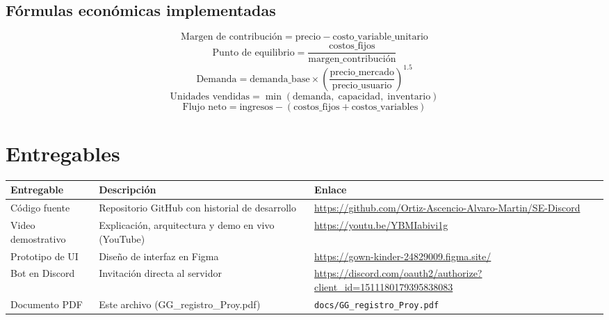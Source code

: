 \documentclass[12pt,spanish]{article}
\begin{document}
\subsection*{Fórmulas económicas implementadas}

\begin{tcolorbox}[colback=codebg, colframe=gray!50, fontupper=\small]
\[
  \text{Margen de contribución} = \text{precio} - \text{costo\_variable\_unitario}
\]
\[
  \text{Punto de equilibrio} = \frac{\text{costos\_fijos}}{\text{margen\_contribución}}
\]
\[
  \text{Demanda} = \text{demanda\_base} \times
    \left(\frac{\text{precio\_mercado}}{\text{precio\_usuario}}\right)^{1.5}
\]
\[
  \text{Unidades vendidas} = \min(\text{demanda},\; \text{capacidad},\; \text{inventario})
\]
\[
  \text{Flujo neto} = \text{ingresos} - (\text{costos\_fijos} + \text{costos\_variables})
\]
\end{tcolorbox}

\section{Entregables}

\begin{center}
\begin{tabular}{lll}
  \toprule
  Entregable & Descripci\'on & Enlace \\
  \midrule
  C\'odigo fuente & Repositorio GitHub con historial de desarrollo
    & \url{https://github.com/Ortiz-Ascencio-Alvaro-Martin/SE-Discord} \\[4pt]
  Video demostrativo & Explicaci\'on, arquitectura y demo en vivo (YouTube)
    & \url{https://youtu.be/YBMIabivi1g} \\[4pt]
  Prototipo de UI & Dise\~no de interfaz en Figma
    & \url{https://gown-kinder-24829009.figma.site/} \\[4pt]
  Bot en Discord & Invitaci\'on directa al servidor
    & \url{https://discord.com/oauth2/authorize?client_id=1511180179395838083} \\[4pt]
  Documento PDF & Este archivo (GG\_registro\_Proy.pdf)
    & \texttt{docs/GG\_registro\_Proy.pdf} \\
  \bottomrule
\end{tabular}
\end{center}

\end{document}
